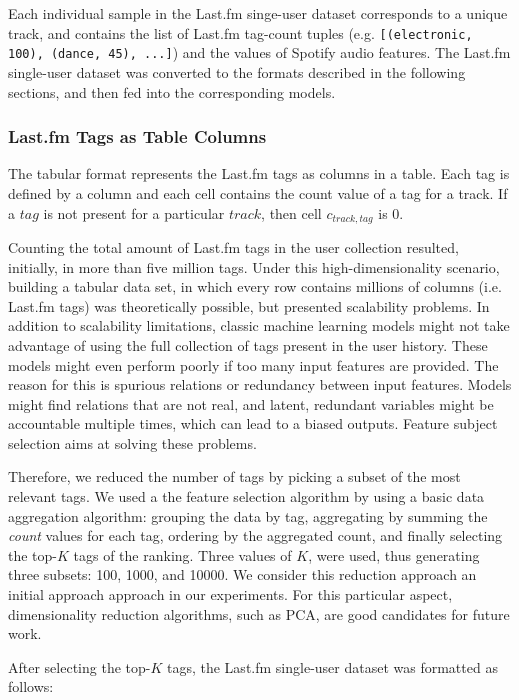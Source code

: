 \documentclass[sn-mathphys]{sn-jnl}%
\theoremstyle{thmstyleone}%
\theoremstyle{thmstyletwo}%
\theoremstyle{thmstylethree}%
\begin{document}
Each individual sample in the Last.fm singe-user dataset corresponds to a unique track,
and contains the list of Last.fm tag-count tuples (e.g. \verb|[(electronic, 100), (dance, 45), ...]|)
and the values of Spotify audio features.
The Last.fm single-user dataset was converted to the formats described in the following sections, and then fed into the corresponding models.


\subsubsection{Last.fm Tags as Table Columns}
The tabular format represents the Last.fm tags as columns in a table.
Each tag is defined by a column and each cell contains the count value of a tag for a track.
If a $tag$ is not present for a particular $track$, then cell $c_{track,tag}$ is \num{0}.

Counting the total amount of Last.fm tags in the user collection resulted, initially, in more than five million tags.
Under this high-dimensionality scenario, building a tabular data set, in which every row contains millions of columns (i.e. Last.fm tags) was theoretically possible, but presented scalability problems.
In addition to scalability limitations, classic machine learning models might not take advantage of using the full collection of tags present in the user history.
These models might even perform poorly if too many input features are provided.
The reason for this is spurious relations or redundancy  between input features.
Models might find relations that are not real, and latent, redundant variables might be accountable multiple times, which can lead to a biased outputs.
Feature subject selection aims at solving these problems.


Therefore, we reduced the number of tags by picking a subset of the most relevant tags.
We used a the feature selection algorithm by using a basic data aggregation algorithm: grouping the data by tag, aggregating by summing the \emph{count} values for each tag,
ordering by the aggregated count, and finally selecting the top-$K$ tags of the ranking.
Three values of $K$, were used, thus generating three subsets: \num{100}, \num{1000}, and \num{10000}.
We consider this reduction approach an initial approach approach in our experiments.
For this particular aspect, dimensionality reduction algorithms, such as PCA, are good candidates for future work.

After selecting the top-$K$ tags, the Last.fm single-user dataset was formatted as follows:
\end{document}
